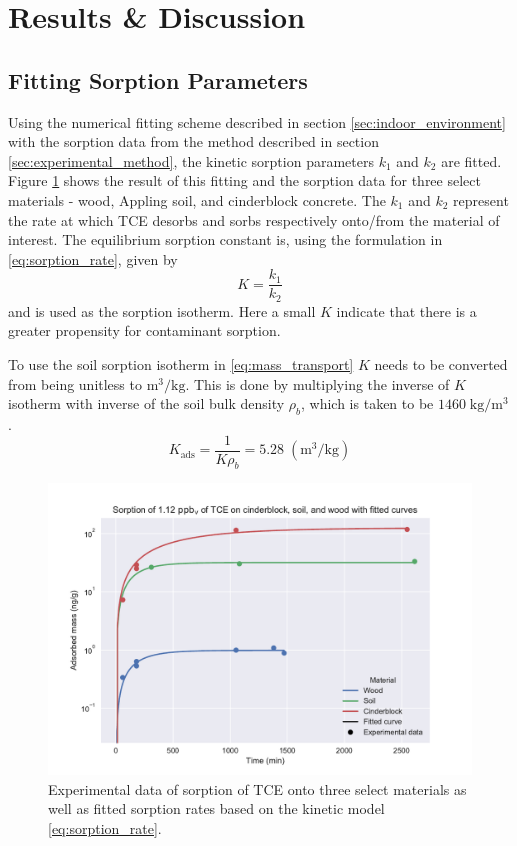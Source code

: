 \section{Results \& Discussion}\label{sec:results}

\subsection{Fitting Sorption Parameters}

Using the numerical fitting scheme described in section \ref{sec:indoor_environment} with the sorption data from the method described in section \ref{sec:experimental_method}, the kinetic sorption parameters $k_1$ and $k_2$ are fitted.
Figure \ref{fig:sorption_fit} shows the result of this fitting and the sorption data for three select materials - wood, Appling soil, and cinderblock concrete.
The $k_1$ and $k_2$ represent the rate at which TCE desorbs and sorbs respectively onto/from the material of interest.
The equilibrium sorption constant is, using the formulation in \eqref{eq:sorption_rate}, given by
\begin{equation}
  K = \frac{k_1}{k_2}
\end{equation}
and is used as the sorption isotherm.
Here a small $K$ indicate that there is a greater propensity for contaminant sorption.\par

To use the soil sorption isotherm in \eqref{eq:mass_transport} $K$ needs to be converted from being unitless to $\mathrm{m^3/kg}$.
This is done by multiplying the inverse of $K$ isotherm with inverse of the soil bulk density $\rho_b$, which is taken to be $1460 \; \mathrm{kg/m^3}$.
\begin{equation}
  K_\mathrm{ads} = \frac{1}{K \rho_b} = 5.28 \; \mathrm{(m^3/kg)}
\end{equation}

\begin{figure}[htb!]
  \includegraphics[width=\textwidth]{sorption_fit.pdf}
  \caption{Experimental data of sorption of TCE onto three select materials as well as fitted sorption rates based on the kinetic model \eqref{eq:sorption_rate}.}
  \label{fig:sorption_fit}
\end{figure}

